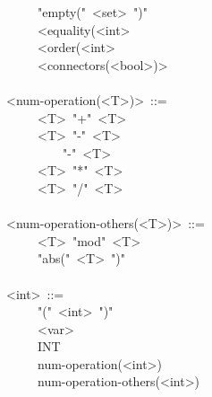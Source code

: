 \begin{footnotesize}
\begin{mdpre}
~~~~\textbar{}~"empty("~{\textless{}set\textgreater{}}~")"\\
~~~~\textbar{}~{\textless{}equality(\textless{}int\textgreater{}}\\
~~~~\textbar{}~{\textless{}order(\textless{}int\textgreater{}}\\
~~~~\textbar{}~{\textless{}connectors(\textless{}bool\textgreater{})\textgreater{}}\\
\\
{\textless{}num-operation(\textless{}T\textgreater{})\textgreater{}}~::=\\
~~~~\textbar{}~{\textless{}T\textgreater{}}~"+"~{\textless{}T\textgreater{}}\\
~~~~\textbar{}~{\textless{}T\textgreater{}}~"-"~{\textless{}T\textgreater{}}\\
~~~~\textbar{}~~~~~"-"~{\textless{}T\textgreater{}}\\
~~~~\textbar{}~{\textless{}T\textgreater{}}~"*"~{\textless{}T\textgreater{}}\\
~~~~\textbar{}~{\textless{}T\textgreater{}}~"/"~{\textless{}T\textgreater{}}\\
\\
{\textless{}num-operation-others(\textless{}T\textgreater{})\textgreater{}}~::=\\
~~~~\textbar{}~{\textless{}T\textgreater{}}~"mod"~{\textless{}T\textgreater{}}\\
~~~~\textbar{}~"abs("~{\textless{}T\textgreater{}}~")"\\
\\
{\textless{}int\textgreater{}}~::=\\
~~~~\textbar{}~"("~{\textless{}int\textgreater{}}~")"\\
~~~~\textbar{}~{\textless{}var\textgreater{}}\\
~~~~\textbar{}~INT\\
~~~~\textbar{}~num-operation({\textless{}int\textgreater{}})\\
~~~~\textbar{}~num-operation-others({\textless{}int\textgreater{}})\\

\end{mdpre}
\end{footnotesize}
